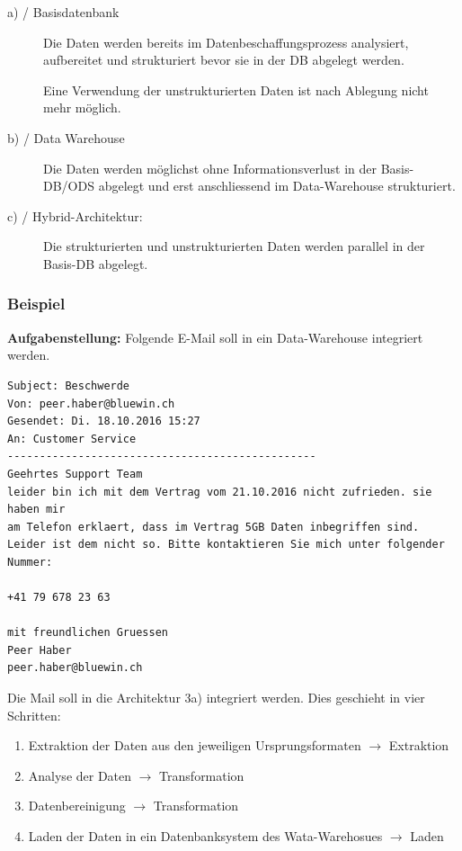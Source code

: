 \documentclass[a4paper, 11pt, nofootinbib]{article}
\begin{document}
\begin{description}
	\item[a) / Basisdatenbank] Die Daten werden bereits im Datenbeschaffungsprozess analysiert, aufbereitet und strukturiert bevor sie in der DB abgelegt werden. 
	
	Eine Verwendung der unstrukturierten Daten ist nach Ablegung nicht mehr möglich.
	\item[b) / Data Warehouse] Die Daten werden möglichst ohne Informationsverlust in der Basis-DB/ODS abgelegt und erst anschliessend im Data-Warehouse strukturiert.
	\item[c) / Hybrid-Architektur: ] Die strukturierten und unstrukturierten Daten werden parallel in der Basis-DB abgelegt.
\end{description}

\newpage

\subsubsection{Beispiel}
\textbf{Aufgabenstellung: } Folgende E-Mail soll in ein Data-Warehouse integriert werden.

\begin{lstlisting}
Subject: Beschwerde
Von: peer.haber@bluewin.ch
Gesendet: Di. 18.10.2016 15:27
An: Customer Service
------------------------------------------------
Geehrtes Support Team
leider bin ich mit dem Vertrag vom 21.10.2016 nicht zufrieden. sie haben mir 
am Telefon erklaert, dass im Vertrag 5GB Daten inbegriffen sind. 
Leider ist dem nicht so. Bitte kontaktieren Sie mich unter folgender Nummer:

+41 79 678 23 63

mit freundlichen Gruessen
Peer Haber
peer.haber@bluewin.ch

\end{lstlisting}

Die Mail soll in die Architektur 3a) integriert werden. Dies geschieht in vier Schritten:

\begin{enumerate}
	\item Extraktion der Daten aus den jeweiligen Ursprungsformaten $\rightarrow$ Extraktion
	\item Analyse der Daten $\rightarrow$ Transformation
	\item Datenbereinigung $\rightarrow$ Transformation
	\item Laden der Daten in ein Datenbanksystem des Wata-Warehosues $\rightarrow$ Laden
\end{enumerate}
\end{document}
